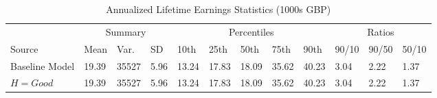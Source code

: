 \documentclass[border=3mm,preview]{standalone}\usepackage{booktabs}
\begin{document}
\begin{landscape}
\small
\begin{table} 
\center\caption*{Annualized Lifetime Earnings Statistics (1000s GBP)} 
\begin{tabular}{l | l l l | l l l l l | l l l} 
\toprule 
 & \multicolumn{3}{c}{Summary} & \multicolumn{5}{c}{Percentiles} & \multicolumn{3}{c}{Ratios} \\ 
Source & Mean & Var. & SD & 10th & 25th & 50th & 75th & 90th & 90/10 & 90/50 & 50/10 \\ 
\midrule 
Baseline Model & 19.39 & 35527 & 5.96 & 
        13.24 & 17.83 & 18.09 & 35.62 & 40.23 &
        3.04 & 2.22 & 1.37 \\ 
$H = Good$ & 19.39 & 35527 & 5.96 & 
        13.24 & 17.83 & 18.09 & 35.62 & 40.23 &
        3.04 & 2.22 
        & 1.37 \\ 
\bottomrule 
\end{tabular}
\end{table}
\end{landscape}
\end{document}
